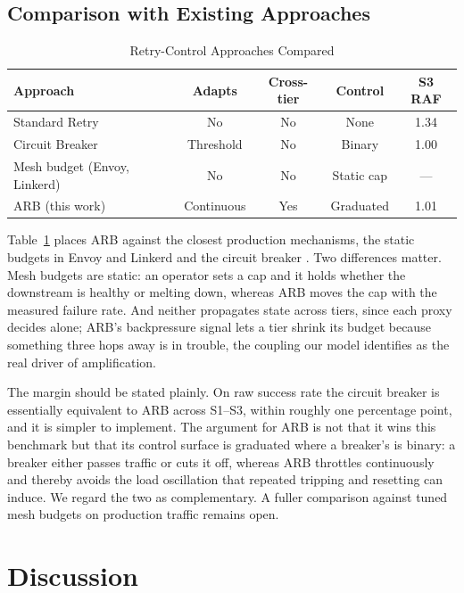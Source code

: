 \documentclass[conference]{IEEEtran}
\begin{document}
\subsection{Comparison with Existing Approaches}

\begin{table}[htbp]
\caption{Retry-Control Approaches Compared}
\label{tab:approach_comparison}
\centering
\small
\setlength{\tabcolsep}{3pt}
\begin{tabular}{@{}p{2.45cm}cccc@{}}
\toprule
\textbf{Approach} & \textbf{Adapts} & \textbf{Cross-tier} & \textbf{Control} & \textbf{S3 RAF} \\
\midrule
Standard Retry & No & No & None & 1.34 \\
Circuit Breaker & Threshold & No & Binary & 1.00 \\
Mesh budget (Envoy, Linkerd) & No & No & Static cap & --- \\
ARB (this work) & Continuous & Yes & Graduated & 1.01 \\
\bottomrule
\end{tabular}
\end{table}

Table~\ref{tab:approach_comparison} places ARB against the closest production mechanisms, the static budgets in Envoy and Linkerd \cite{envoy_retry, linkerd_retry} and the circuit breaker \cite{nygard2007release}. Two differences matter. Mesh budgets are static: an operator sets a cap and it holds whether the downstream is healthy or melting down, whereas ARB moves the cap with the measured failure rate. And neither propagates state across tiers, since each proxy decides alone; ARB's backpressure signal lets a tier shrink its budget because something three hops away is in trouble, the coupling our model identifies as the real driver of amplification.

The margin should be stated plainly. On raw success rate the circuit breaker is essentially equivalent to ARB across S1--S3, within roughly one percentage point, and it is simpler to implement. The argument for ARB is not that it wins this benchmark but that its control surface is graduated where a breaker's is binary: a breaker either passes traffic or cuts it off, whereas ARB throttles continuously and thereby avoids the load oscillation that repeated tripping and resetting can induce. We regard the two as complementary. A fuller comparison against tuned mesh budgets on production traffic remains open.

\section{Discussion}
\end{document}

